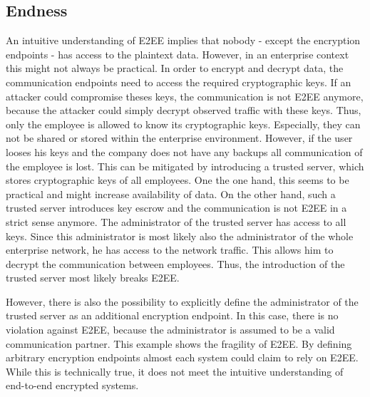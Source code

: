 \documentclass[../main.tex]{subfiles}
\begin{document}
\subsection{Endness}

An intuitive understanding of E2EE implies that nobody - except the encryption endpoints - has access to the plaintext data.
However, in an enterprise context this might not always be practical.
In order to encrypt and decrypt data, the communication endpoints need to access the required cryptographic keys.
If an attacker could compromise theses keys, the communication is not E2EE anymore, because the attacker could simply decrypt observed traffic with these keys.
Thus, only the employee is allowed to know its cryptographic keys.
Especially, they can not be shared or stored within the enterprise environment.
However, if the user looses his keys and the company does not have any backups all communication of the employee is lost.
This can be mitigated by introducing a trusted server, which stores cryptographic keys of all employees.
One the one hand, this seems to be practical and might increase availability of data. 
On the other hand, such a trusted server introduces key escrow and the communication is not E2EE in a strict sense anymore.
The administrator of the trusted server has access to all keys.
Since this administrator is most likely also the administrator of the whole enterprise network, he has access to the network traffic.
This allows him to decrypt the communication between employees.
Thus, the introduction of the trusted server most likely breaks E2EE.

However, there is also the possibility to explicitly define the administrator of the trusted server as an additional encryption endpoint.
In this case, there is no violation against E2EE, because the administrator is assumed to be a valid communication partner.
This example shows the fragility of E2EE.
By defining arbitrary encryption endpoints almost each system could claim to rely on E2EE.
While this is technically true, it does not meet the intuitive understanding of end-to-end encrypted systems.
\end{document}
